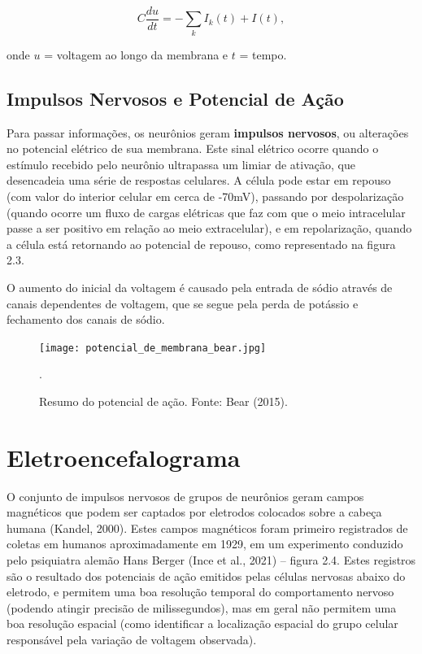 \begin{equation}
    C \frac{d u }{ d t} =  - \sum_{k} I_k (t) + I (t),
\end{equation}

onde $u$ = voltagem ao longo da membrana e $t$ = tempo. 




\subsection{Impulsos Nervosos e Potencial de Ação}
Para passar informações, os neurônios geram \textbf{impulsos nervosos}, ou alterações no potencial elétrico de sua membrana. Este sinal elétrico
ocorre quando o estímulo recebido pelo neurônio ultrapassa um limiar de ativação, que desencadeia uma série de respostas celulares. A célula pode 
estar em repouso (com valor do interior celular em cerca de -70mV), passando por despolarização (quando ocorre um fluxo de cargas elétricas que faz com 
que o meio intracelular passe a ser positivo em relação ao meio extracelular), e em repolarização, quando a célula está retornando ao potencial de repouso,
como representado na figura 2.3. 

O aumento do inicial da voltagem é causado pela entrada de sódio através de canais dependentes de voltagem, que se segue 
pela perda de potássio e fechamento dos canais de sódio. 


\begin{figure}[!h]
    \centering
    \texttt{[image: potencial\_de\_membrana\_bear.jpg]}
    \caption[Impulsos nervosos conduzidos em neurônios]{Resumo do potencial de ação. Fonte: Bear (2015).}.\label{fig:potencial}
    \end{figure}


\section{Eletroencefalograma}
O conjunto de impulsos nervosos de grupos de neurônios geram campos
magnéticos que podem ser captados por eletrodos colocados sobre a cabeça humana
(Kandel, 2000). Estes campos magnéticos foram primeiro registrados de coletas em
humanos aproximadamente em 1929, em um experimento conduzido pelo psiquiatra
alemão Hans Berger (Ince et al., 2021) – figura
2.4. Estes registros são o resultado dos potenciais de ação emitidos pelas células
nervosas abaixo do eletrodo, e permitem uma boa resolução temporal do
comportamento nervoso (podendo atingir precisão de milissegundos), mas em geral
não permitem uma boa resolução espacial (como identificar a localização espacial do
grupo celular responsável pela variação de voltagem observada).


